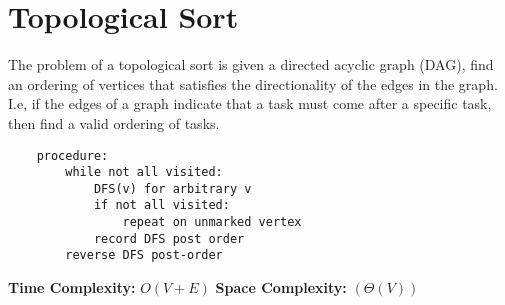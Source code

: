 \documentclass{article}
\begin{document}
\section{Topological Sort}
The problem of a topological sort is given a directed acyclic graph (DAG), find an ordering of vertices that satisfies the directionality of the edges in the graph.
I.e, if the edges of a graph indicate that a task must come after a specific task, then find a valid ordering of tasks.
\begin{lstlisting}
    procedure:
        while not all visited:
            DFS(v) for arbitrary v
            if not all visited:
                repeat on unmarked vertex
            record DFS post order
        reverse DFS post-order
\end{lstlisting}
\textbf{Time Complexity: } $O(V+E)$
\textbf{Space Complexity: } $(\Theta(V))$
\end{document}

